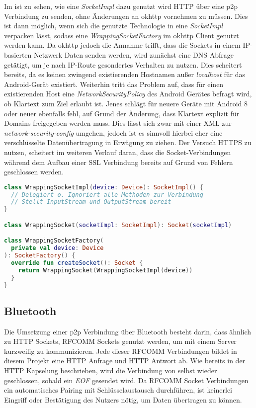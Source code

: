         Im  ist zu sehen, wie eine {\it SocketImpl} dazu genutzt wird HTTP über eine p2p Verbindung zu senden, ohne Änderungen an okhttp vornehmen zu müssen. Dies ist dann möglich, wenn sich die genutzte Technologie in eine {\it SocketImpl} verpacken lässt, sodass eine {\it WrappingSocketFactory} im okhttp Client genutzt werden kann. Da okhttp jedoch die Annahme trifft, dass die Sockets in einem IP-basierten Netzwerk Daten senden werden, wird zunächst eine DNS Abfrage getätigt, um je nach IP-Route gesondertes Verhalten zu nutzen. Dies scheitert bereits, da es keinen zwingend existierenden Hostnamen außer {\it localhost} für das Android-Gerät existiert. Weiterhin tritt das Problem auf, dass für einen existierenden Host eine {\it NetworkSecurityPolicy} des Android Gerätes befragt wird, ob Klartext zum Ziel erlaubt ist. Jenes schlägt für neuere Geräte mit Android 8 oder neuer ebenfalls fehl, auf Grund der Änderung, dass Klartext explizit für Domains freigegeben werden muss. Dies lässt sich zwar mit einer XML zur {\it network-security-config} umgehen, jedoch ist es sinnvoll hierbei eher eine verschlüsselte Datenübertragung in Erwägung zu ziehen. Der Versuch HTTPS zu nutzen, scheitert im weiteren Verlauf daran, dass die Socket-Verbindungen während dem Aufbau einer SSL Verbindung bereits auf Grund von Fehlern geschlossen werden.
        
        \begin{lstlisting}[frame=bt, label={lst:android:socketfactory}, language=Kotlin, caption=HTTP Kapselung als SocketFactory (Clientcode in Kotlin)]
class WrappingSocketImpl(device: Device): SocketImpl() {
  // Delegiert o. Ignoriert alle Methoden zur Verbindung
  // Stellt InputStream und OutputStream bereit
}

class WrappingSocket(socketImpl: SocketImpl): Socket(socketImpl)

class WrappingSocketFactory(
  private val device: Device
): SocketFactory() {
  override fun createSocket(): Socket {
    return WrappingSocket(WrappingSocketImpl(device))
  }
}
        \end{lstlisting}        
        
        \subsection{Bluetooth}
        Die Umsetzung einer p2p Verbindung über Bluetooth besteht darin, dass ähnlich zu HTTP Sockets, RFCOMM Sockets genutzt werden, um mit einem Server kurzweilig zu kommunizieren. Jede dieser RFCOMM Verbindungen bildet in diesem Projekt eine HTTP Anfrage und HTTP Antwort ab. Wie bereits in der HTTP Kapselung beschrieben, wird die Verbindung von selbst wieder geschlossen, sobald ein {\it EOF} gesendet wird. Da RFCOMM Socket Verbindungen ein automatisches Pairing mit Schlüsselaustausch durchführen, ist keinerlei Eingriff oder Bestätigung des Nutzers nötig, um Daten übertragen zu können.
        
